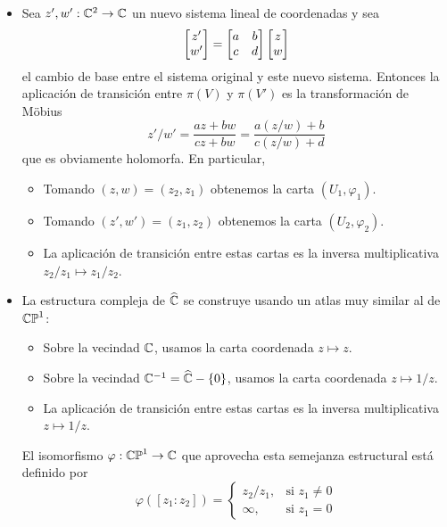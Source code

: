\begin{solution}
\begin{itemize}
    \item Sea $z', w' : \mathbb C^2 \to \mathbb C$ un nuevo sistema lineal de coordenadas y sea
    $$\begin{bmatrix} z' \\ w' \end{bmatrix} = \begin{bmatrix} a & b \\ c & d \end{bmatrix} \begin{bmatrix} z \\ w \end{bmatrix}$$
    el cambio de base entre el sistema original y este nuevo sistema. Entonces la aplicación de transición entre $\pi(V)$ y $\pi(V')$ es la transformación de Möbius
    $$z'/w' = \frac {az + bw} {cz + bw} = \frac {a(z/w) + b} {c(z/w) + d}$$
    que es obviamente holomorfa. En particular,
    \begin{itemize}
        \item Tomando $(z, w) = (z_2, z_1)$ obtenemos la carta $(U_1, \varphi_1)$.
        \item Tomando $(z', w') = (z_1, z_2)$ obtenemos la carta $(U_2, \varphi_2)$.
        \item La aplicación de transición entre estas cartas es la inversa multiplicativa $z_2 / z_1 \mapsto z_1 / z_2$.
    \end{itemize}
    
    \item La estructura compleja de $\widehat {\mathbb C}$ se construye usando un atlas muy similar al de $\mathbb {CP}^1$:
    \begin{itemize}
        \item Sobre la vecindad $\mathbb C$, usamos la carta coordenada $z \mapsto z$.
        \item Sobre la vecindad $\mathbb C^{-1} = \widehat {\mathbb C} - \{ 0 \}$, usamos la carta coordenada $z \mapsto 1/z$.
        \item La aplicación de transición entre estas cartas es la inversa multiplicativa $z \mapsto 1/z$.
    \end{itemize}
    
    El isomorfismo $\varphi : \mathbb {CP}^1 \to \mathbb C$ que aprovecha esta semejanza estructural está definido por
    $$
    \varphi([z_1 : z_2]) =
    \begin{cases}
        z_2 / z_1, & \text{si } z_1 \ne 0 \\
        \infty, & \text{si } z_1 = 0
    \end{cases}
    $$
\end{itemize}
\end{solution}
